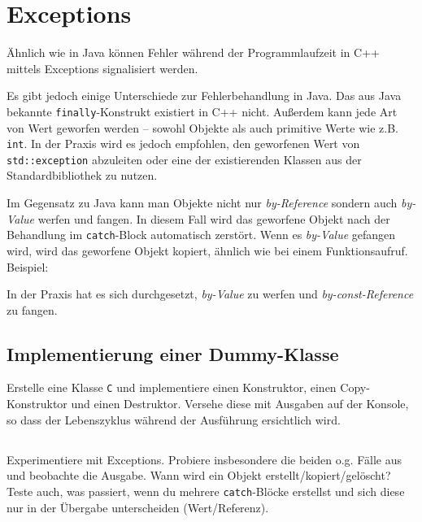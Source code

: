 \section{\ExercisePrefixObjectOrientation Exceptions}
Ähnlich wie in Java können Fehler während der Programmlaufzeit in C++ mittels Exceptions signalisiert werden.


Es gibt jedoch einige Unterschiede zur Fehlerbehandlung in Java.
Das aus Java bekannte \lstinline{finally}-Konstrukt existiert in C++ nicht.
Außerdem kann jede Art von Wert geworfen werden -- sowohl Objekte als auch primitive Werte wie z.B. \lstinline{int}.
In der Praxis wird es jedoch empfohlen, den geworfenen Wert von \lstinline{std::exception} abzuleiten oder eine der existierenden Klassen aus der Standardbibliothek zu nutzen.

Im Gegensatz zu Java kann man Objekte nicht nur \emph{by-Reference} sondern auch \emph{by-Value} werfen und fangen.
In diesem Fall wird das geworfene Objekt nach der Behandlung im \lstinline{catch}-Block automatisch zerstört.
Wenn es \emph{by-Value} gefangen wird, wird das geworfene Objekt kopiert, ähnlich wie bei einem Funktionsaufruf.
Beispiel:


In der Praxis hat es sich durchgesetzt, \emph{by-Value} zu werfen und \emph{by-const-Reference} zu fangen.

\subsection{Implementierung einer Dummy-Klasse}
Erstelle eine Klasse \lstinline{C} und implementiere einen Konstruktor, einen Copy-Konstruktor und einen Destruktor.
Versehe diese mit Ausgaben auf der Konsole, so dass der Lebenszyklus während der Ausführung ersichtlich wird.

\subsection{}
Experimentiere mit Exceptions.
Probiere insbesondere die beiden o.g. Fälle aus und beobachte die Ausgabe.
Wann wird ein Objekt erstellt/kopiert/gelöscht?
Teste auch, was passiert, wenn du mehrere \lstinline{catch}-Blöcke erstellst und sich diese nur in der Übergabe unterscheiden (Wert/Referenz).


